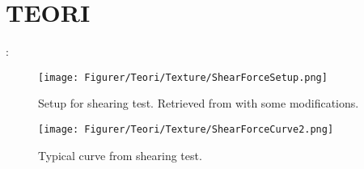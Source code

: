 
\section{TEORI}:





\begin{figure}[H]
    \centering
    \texttt{[image: Figurer/Teori/Texture/ShearForceSetup.png]}
    \caption{Setup for shearing test. Retrieved from \cite{garcia-segovia_texture_2011} with some modifications.}
    \label{fig:Teori:ShearingTestSetup}
\end{figure}
\begin{figure}[H]
    \centering
    \texttt{[image: Figurer/Teori/Texture/ShearForceCurve2.png]}
    \caption{Typical curve from shearing test.}
    \label{fig:Teori:ShearingTestCurve}
\end{figure}

